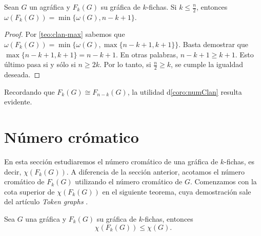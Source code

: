 \begin{corolario}
\label{coro:numClan}
    Sean $G$ un agr\'afica y $F_k(G)$ su gr\'afica de $k$-fichas. Si $k \leq
    \frac{n}{2}$, entonces $\omega(F_k(G))= \min\{\omega(G), n-k+1\}$.
\end{corolario}

\begin{proof}
    Por \cref{teo:clan-max} sabemos que $\omega(F_k(G))= \min \{\omega(G), \max
    \{n-k+1,k+1\}\}$. Basta demostrar que $\max \{n-k+1, k+1\} = n-k+1$. En
    otras palabras, $n-k+1 \geq k+1$. Esto \'ultimo pasa si y s\'olo si $n \geq
    2k$. Por lo tanto, si $\frac{n}{2} \geq k$, se cumple la igualdad deseada.
\end{proof}

Recordando que $F_k(G) \cong F_{n-k}(G)$, la utilidad  d\cref{coro:numClan}
resulta evidente.

\section{N\'umero cr\'omatico}%
\label{sec:num cromatico}

En esta secci\'on estudiaremos el n\'umero crom\'atico de una gr\'afica de
$k$-fichas, es decir, $\chi (F_k(G))$. A diferencia de la secci\'on anterior,
acotamos el n\'umero crom\'atico de $F_k(G)$ utilizando el n\'umero crom\'atico
de $G$. Comenzamos con la cota superior de $ \chi (F_k(G))$ en el siguiente
teorema, cuya demostraci\'on sale del art\'iculo \textit{Token graphs}
\cite{fabilaToken}.

\begin{teorema}
\label{teo:num cromatico de G y F(G)}
    Sea $G$ una gr\'afica y $F_k(G)$ su gr\'afica de $k$-fichas, entonces
    \[
        \chi(F_k(G)) \leq \chi (G).
    \]
\end{teorema}

